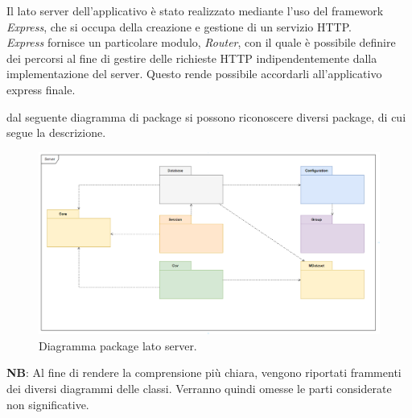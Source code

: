 \documentclass[../manuale_sviluppatore.tex]{subfiles}
\begin{document}
Il lato server dell'applicativo è stato realizzato mediante l'uso del framework \emph{Express}, che 
si occupa della creazione e gestione di un servizio HTTP. \\
\emph{Express} fornisce un particolare modulo, \emph{Router}, con il quale è possibile definire dei 
percorsi al fine di gestire delle richieste HTTP indipendentemente dalla implementazione del server. 
Questo rende possibile accordarli all'applicativo express finale.

\par dal seguente diagramma di package si possono riconoscere diversi package, di cui segue la 
descrizione.\\

\begin{figure}[H]
	\centering
	\includegraphics[width=18cm]{src/img/package-server.png}
	\caption{Diagramma package lato server.}
\end{figure}

\textbf{NB}: Al fine di rendere la comprensione più chiara, vengono riportati frammenti dei diversi 
diagrammi delle classi. Verranno quindi omesse le parti considerate non significative.
\newpage
\end{document}

